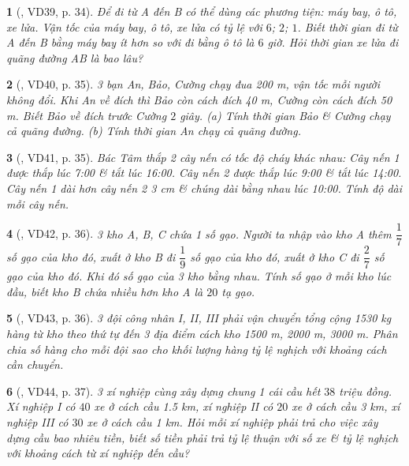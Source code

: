 \documentclass{article}
\newtheorem{baitoan}{}
\begin{document}
\begin{baitoan}[\cite{Binh_Toan_7_tap_1}, VD39, p. 34]
	Để đi từ A đến B có thể dùng các phương tiện: máy bay, ô tô, xe lửa. Vận tốc của máy bay, ô tô, xe lửa có tỷ lệ với $6$; $2$; $1$. Biết thời gian đi từ A đến B bằng máy bay ít hơn so với đi bằng ô tô là $6$ giờ. Hỏi thời gian xe lửa đi quãng đường AB là bao lâu?
\end{baitoan}

\begin{baitoan}[\cite{Binh_Toan_7_tap_1}, VD40, p. 35]
	3 bạn An, Bảo, Cường chạy đua {\rm200 m}, vận tốc mỗi người không đổi. Khi An về đích thì Bảo còn cách đích {\rm40 m}, Cường còn cách đích {\rm50 m}. Biết Bảo về đích trước Cường $2$ giây. (a) Tính thời gian Bảo \& Cường chạy cả quãng đường. (b) Tính thời gian An chạy cả quãng đường.
\end{baitoan}

\begin{baitoan}[\cite{Binh_Toan_7_tap_1}, VD41, p. 35]
	Bác Tâm thắp 2 cây nến có tốc độ cháy khác nhau: Cây nến 1 được thắp lúc {\rm7:00} \& tắt lúc {\rm16:00}. Cây nến 2 được thắp lúc {\rm9:00} \& tắt lúc {\rm14:00}. Cây nến 1 dài hơn cây nến 2 {\rm3 cm} \& chúng dài bằng nhau lúc {\rm10:00}. Tính độ dài mỗi cây nến.
\end{baitoan}

\begin{baitoan}[\cite{Binh_Toan_7_tap_1}, VD42, p. 36]
	3 kho A, B, C chứa 1 số gạo. Người ta nhập vào kho A thêm $\dfrac{1}{7}$ số gạo của kho đó, xuất ở kho B đi $\dfrac{1}{9}$ số gạo của kho đó, xuất ở kho C đi $\dfrac{2}{7}$ số gạo của kho đó. Khi đó số gạo của 3 kho bằng nhau. Tính số gạo ở mỗi kho lúc đầu, biết kho B chứa nhiều hơn kho A là $20$ tạ gạo.
\end{baitoan}

\begin{baitoan}[\cite{Binh_Toan_7_tap_1}, VD43, p. 36]
	3 đội công nhân I, II, III phải vận chuyển tổng cộng {\rm1530 kg} hàng từ kho theo thứ tự đến 3 địa điểm cách kho {\rm1500 m, 2000 m, 3000 m}. Phân chia số hàng cho mỗi đội sao cho khối lượng hàng tỷ lệ nghịch với khoảng cách cần chuyển.
\end{baitoan}

\begin{baitoan}[\cite{Binh_Toan_7_tap_1}, VD44, p. 37]
	3 xí nghiệp cùng xây dựng chung 1 cái cầu hết $38$ triệu đồng. Xí nghiệp I có $40$ xe ở cách cầu {\rm1.5 km}, xí nghiệp II có $20$ xe ở cách cầu {\rm3 km}, xí nghiệp III có $30$ xe ở cách cầu {\rm1 km}. Hỏi mỗi xí nghiệp phải trả cho việc xây dựng cầu bao nhiêu tiền, biết số tiền phải trả tỷ lệ thuận với số xe \& tỷ lệ nghịch với khoảng cách từ xí nghiệp đến cầu?
\end{baitoan}
\end{document}
